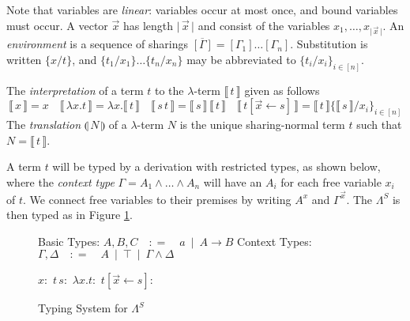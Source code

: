 \documentclass[a4paper,UKenglish,cleveref, autoref]{lipics-v2019}
\makeatletter
\newcommand{\SLC}{\Lambda^{S}}
\newcommand{\abs}[2]{\lambda #1 . #2}
\newcommand{\app}[2]{#1 \, #2}
\newcommand{\share}[3]{#1 [#2 \leftarrow #3]}
\newcommand{\size}[1]{\vert \, #1 \, \vert}
\newcommand{\sub}[3]{#1 \{ #2 / #3 \}}
\newcommand{\compile}[1]{\llparenthesis \, #1 \, \rrparenthesis}
\newcommand{\readbackclose}[1]{\llbracket \, #1 \, \rrbracket }
\newcommand{\sharerule}{\triangle}
\newcommand{\apprule}{@}
\newcommand{\lamrule}{\lambda}
\makeatother
\begin{document}
\noindent Note that variables are \emph{linear}: variables occur at most once, and bound variables must occur. A vector $\vec{x}$ has length $\size{\vec{x}}$ and consist of the variables $x_{1}, \dots, x_{\size{\vec{x}}}$. An \emph{environment} is a sequence of sharings $\overline{[\Gamma]} = [\Gamma_{1}] \dots [\Gamma_{n}]$. Substitution is written $\sub{}{x}{t}$, and $\sub{}{t_{1}}{x_{1}} \dots \sub{}{t_{n}}{x_{n}}$ may be abbreviated to $\sub{}{t_{i}}{x_{i}}_{i \in [n]}$.

\begin{definition}
The \emph{interpretation} of a term $t$ to the $\lambda$-term $\readbackclose{t}$ given as follows
$$\readbackclose{x} = x \quad \readbackclose{\abs{x}{t}} = \abs{x}{\readbackclose{t}} \quad \readbackclose{\app{s}{t}} = \app{\readbackclose{s}}{\readbackclose{t}} \quad \readbackclose{\share{t}{\vec{x}}{s}} = \readbackclose{t} \sub{}{\readbackclose{s}}{x_{i}}_{i \in [n]}$$
The \emph{translation} $\compile{N}$ of a $\lambda$-term $N$ is the unique sharing-normal term $t$ such that $N = \readbackclose{t}$.
\end{definition}

A term $t$ will be typed by a derivation with restricted types, as shown below, where the \emph{context type} $\Gamma = A_{1} \wedge \dots \wedge A_{n}$ will have an $A_{i}$ for each free variable $x_{i}$ of $t$. We connect free variables to their premises by writing $A^{x}$ and $\Gamma^{\vec{x}}$. The $\SLC$ is then typed as in Figure \ref{fig:SLCT}.

\begin{figure}[h]
\begin{center}
Basic Types: $A, B, C \quad {:}{=} \quad a \, \, \, \vert \, \, \, A \rightarrow B$ \hspace{1cm} Context Types: $\Gamma, \Delta \quad {:}{=} \quad A \, \, \, \vert \, \, \, \top \, \, \, \vert \, \, \, \Gamma \wedge \Delta$
\end{center}
$x :$ {\small {}}
\hfill
$\app{t}{s} :$ {\small \drv{\drv[yellow]{\Gamma ; _[t] ; A \rightarrow B} \wedge \drv[yellow]{\Delta ; _[s] ; A} ; -[\apprule] ; B}}
\hfill
$\abs{x}{t} :$ {\small \drv{\Gamma ; -[\lamrule] ; A \rightarrow \drv[yellow]{\Gamma \wedge A^{x} ; _[t] ; B}}}
\hfill
$\share{t}{\vec{x}}{s} :$ {\small \drv{\Gamma \wedge \drv[yellow]{\Delta ; _[s] ; A ; -[\sharerule] ; A \wedge \dots \wedge A} ; . ; \Gamma \wedge (A \wedge \dots \wedge A)^{\vec{x}} ; _[t] ; B}}
\caption{Typing System for $\SLC$}
\label{fig:SLCT}
\end{figure}
\end{document}
